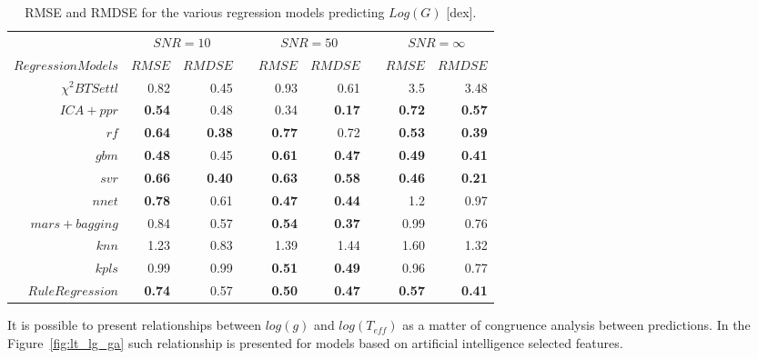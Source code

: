 %
%
\begin{table}\centering
\begin{tabular}{@{}rrrcrrcrr@{}}\toprule
& \multicolumn{2}{c}{$SNR = 10$} & \phantom{ab}& \multicolumn{2}{c}{$SNR = 50$} &
\phantom{ab} & \multicolumn{2}{c}{$SNR = \infty$}\\
\cmidrule{2-3} \cmidrule{5-6} \cmidrule{8-9}
$Regression Models$ & $RMSE$ & $RMDSE$ && $RMSE$ & $RMDSE$     && $RMSE$       & $RMDSE$ \\ \midrule
$\chi^2 BTSettl$    &  0.82 & 0.45        && 0.93   & 0.61     && 3.5          & 3.48 \\
$ ICA+ ppr$         & \bf{0.54} & 0.48     && 0.34  & \bf{0.17} && \bf{0.72}   & \bf{0.57} \\
$rf $               & \bf{0.64} & \bf{0.38} && \bf{0.77} & 0.72    && \bf{0.53} & \bf{0.39} \\
$gbm $              & \bf{0.48} & 0.45    && \bf{0.61}  & \bf{0.47} && \bf{0.49} & \bf{0.41} \\
$ svr $             & \bf{0.66} & \bf{0.40} && \bf{0.63} & \bf{0.58}  && \bf{0.46}  & \bf{0.21} \\
$ nnet $            & \bf{0.78} & 0.61  && \bf{0.47} & \bf{0.44} && 1.2    & 0.97 \\
$ mars+ bagging $   & 0.84      & 0.57      && \bf{0.54} & \bf{0.37} && 0.99    & 0.76 \\
$knn  $             & 1.23      & 0.83      && 1.39 &   1.44     &&  1.60 & 1.32 \\
$ kpls $            & 0.99       & 0.99    && \bf{0.51} & \bf{0.49} && 0.96     & 0.77 \\
$Rule Regression $  & \bf{0.74} & 0.57    && \bf{0.50} & \bf{0.47}  && \bf{0.57} &  \bf{0.41} \\

\bottomrule
\end{tabular}
\caption {RMSE and RMDSE for the various regression models predicting $Log(G)$ [dex].} 
\label{tab:models_G_rmse} 
\end{table}


It is possible to present relationships between $log(g)$ and $log(T_{eff})$
as a matter of congruence analysis between predictions. In the Figure~\ref{fig:lt_lg_ga}
such relationship is presented for models based on artificial intelligence selected features.

